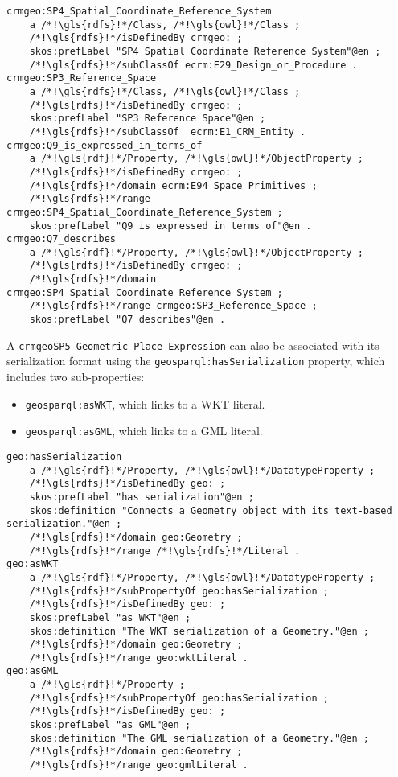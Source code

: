 \begin{lstlisting}[caption=Definition of classes and property in NOnt+S, label={lst:nont-implementation-6}]
crmgeo:SP4_Spatial_Coordinate_Reference_System
    a /*!\gls{rdfs}!*/Class, /*!\gls{owl}!*/Class ;
    /*!\gls{rdfs}!*/isDefinedBy crmgeo: ;
    skos:prefLabel "SP4 Spatial Coordinate Reference System"@en ;
    /*!\gls{rdfs}!*/subClassOf ecrm:E29_Design_or_Procedure .
crmgeo:SP3_Reference_Space
    a /*!\gls{rdfs}!*/Class, /*!\gls{owl}!*/Class ;
    /*!\gls{rdfs}!*/isDefinedBy crmgeo: ;
    skos:prefLabel "SP3 Reference Space"@en ;
    /*!\gls{rdfs}!*/subClassOf  ecrm:E1_CRM_Entity .
crmgeo:Q9_is_expressed_in_terms_of
    a /*!\gls{rdf}!*/Property, /*!\gls{owl}!*/ObjectProperty ;
    /*!\gls{rdfs}!*/isDefinedBy crmgeo: ;
    /*!\gls{rdfs}!*/domain ecrm:E94_Space_Primitives ;
    /*!\gls{rdfs}!*/range crmgeo:SP4_Spatial_Coordinate_Reference_System ;
    skos:prefLabel "Q9 is expressed in terms of"@en .
crmgeo:Q7_describes
    a /*!\gls{rdf}!*/Property, /*!\gls{owl}!*/ObjectProperty ;
    /*!\gls{rdfs}!*/isDefinedBy crmgeo: ;
    /*!\gls{rdfs}!*/domain crmgeo:SP4_Spatial_Coordinate_Reference_System ;
    /*!\gls{rdfs}!*/range crmgeo:SP3_Reference_Space ;
    skos:prefLabel "Q7 describes"@en .  
\end{lstlisting}

A \texttt{\gls{crmgeo}SP5 Geometric Place Expression} can also be associated with its serialization format using the \texttt{geosparql:hasSerialization} property, which includes two sub-properties:

\begin{itemize}
    \item \texttt{geosparql:asWKT}, which links to a WKT literal.
    \item \texttt{geosparql:asGML}, which links to a GML literal.
\end{itemize}

\begin{lstlisting}[caption=Definition of classes and property in NOnt+S, label={lst:nont-implementation-7}]
geo:hasSerialization
    a /*!\gls{rdf}!*/Property, /*!\gls{owl}!*/DatatypeProperty ;
    /*!\gls{rdfs}!*/isDefinedBy geo: ;
    skos:prefLabel "has serialization"@en ;
    skos:definition "Connects a Geometry object with its text-based serialization."@en ;
    /*!\gls{rdfs}!*/domain geo:Geometry ;
    /*!\gls{rdfs}!*/range /*!\gls{rdfs}!*/Literal .
geo:asWKT
    a /*!\gls{rdf}!*/Property, /*!\gls{owl}!*/DatatypeProperty ;
    /*!\gls{rdfs}!*/subPropertyOf geo:hasSerialization ;
    /*!\gls{rdfs}!*/isDefinedBy geo: ;
    skos:prefLabel "as WKT"@en ;
    skos:definition "The WKT serialization of a Geometry."@en ;
    /*!\gls{rdfs}!*/domain geo:Geometry ;
    /*!\gls{rdfs}!*/range geo:wktLiteral .
geo:asGML
    a /*!\gls{rdf}!*/Property ;
    /*!\gls{rdfs}!*/subPropertyOf geo:hasSerialization ;
    /*!\gls{rdfs}!*/isDefinedBy geo: ;
    skos:prefLabel "as GML"@en ;
    skos:definition "The GML serialization of a Geometry."@en ;
    /*!\gls{rdfs}!*/domain geo:Geometry ;
    /*!\gls{rdfs}!*/range geo:gmlLiteral .
\end{lstlisting}


